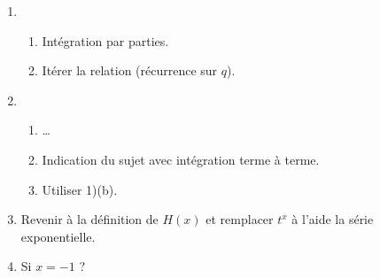 \documentclass[twoside,french,10pt]{VcCours}
\begin{document}
\begin{enumerate}
\item
\begin{enumerate}
	\item Intégration par parties.
	\item Itérer la relation (récurrence sur $q$).
\end{enumerate}
\item 
\begin{enumerate}
	\item \ldots
	\item Indication du sujet avec intégration terme à terme.
	\item Utiliser 1)(b).
\end{enumerate}
\item Revenir à la définition de $H(x)$ et remplacer $t^x$ à l'aide la série 
exponentielle.
\item Si $x=-1$ ?
\end{enumerate}
\end{document}
